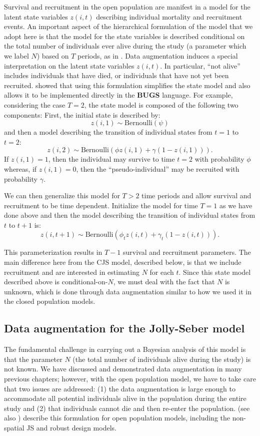 Survival and recruitment in the open population are manifest in a
model for the latent state variables $z(i,t)$ describing individual
mortality and recruitment events.  An important aspect of the
hierarchical formulation of the model that we adopt here is that the
model for the state variables is described conditional on the total
number of individuals ever alive during the study (a parameter which
we label $N$) based on $T$ periods, as in \citet{schwarz_arnason:1996}.  Data
augmentation induces a special interpretation on the latent state
variables $z(i,t)$.
In particular, ``not alive'' includes individuals
that have died, or individuals that have not yet been recruited.
\citet{royle_dorazio:2008} showed that using this formulation
simplifies the state model and also allows it
to be implemented directly in the \textbf{BUGS} language.
For example, considering the case $T=2$, the state model is composed
of the following two components: First, the initial state is described
by:
\[
 z(i,1) \sim \mbox{Bernoulli}(\psi)
\]
and then a model describing the transition of individual states from
$t=1$ to $t=2$:
\[
 z(i,2) \sim \mbox{Bernoulli}( \phi z(i,1)  + \gamma (1-z(i,1)) ).
\]
If $z(i,1)=1$, then the individual may survive to time $t=2$ with
probability $\phi$ whereas, if $z(i,1)=0$, then the
``pseudo-individual'' may be recruited with probability $\gamma$.

We can then generalize this model for $T>2$ time periods and allow survival and
recruitment to be time dependent.  Initialize the
model for time $T=1$ as we have done above
and then the model describing the transition of individual states from
$t$ to $t+1$ is:
\[
 z(i,t+1) \sim \mbox{Bernoulli}( \phi_t z(i,t)  + \gamma_t (1-z(i,t)) ).
\]

This parameterization results in $T-1$ survival and recruitment
parameters.  The main difference here from the CJS model, described below,
 is that we include recruitment and are interested in estimating $N$ for each $t$.
Since this state model described above is conditional-on-$N$, we must
deal with the fact that $N$ is unknown, which is done through data
augmentation similar to how we used it in the closed population
models.


\subsection{Data augmentation for the Jolly-Seber model}
\label{open.sec.dataaugJS}

The fundamental challenge in carrying out a Bayesian analysis of this
model is that the parameter $N$ (the total number of individuals alive
during the study) is not known.  We have discussed and demonstrated
data augmentation in many previous chapters; however, with the open
population model, we have to take care that two issues are addressed:
(1) the data augmentation is large enough to accommodate all potential
individuals alive in the population during the entire study and (2)
that individuals cannot die and then re-enter the population.
\citet{royle_dorazio:2008} (see also \citet{kery_schaub:2011})  
describe this formulation for open
population models, including the non-spatial JS and robust design
models.

